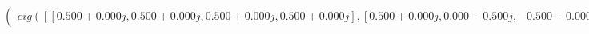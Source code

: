 \documentclass[border=1em]{standalone}
\begin{document}
$
\left(
\begin{array}{cccc}
eig([[0.500+0.000j, 0.500+0.000j, 0.500+0.000j, 0.500+0.000j],[0.500+0.000j, 0.000-0.500j, -0.500-0.000j, -0.000+0.500j],[0.500+0.000j, -0.500-0.000j, 0.500+0.000j, -0.500-0.000j],[0.500+0.000j, -0.000+0.500j, -0.500-0.000j, 0.000-0.500j]])
\end{array}
\right)
$
\end{document}
